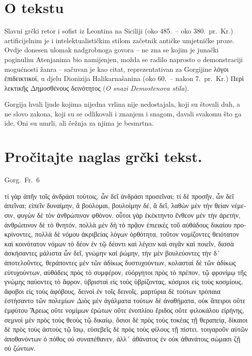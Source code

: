 
\section*{O tekstu}

Slavni grčki retor i sofist iz Leontina na Siciliji (oko 485.\ – oko 380.\ pr.~Kr.) artificijelnim je i intelektualističkim stilom začetnik antičke umjetničke proze. Ovdje donesen ulomak nadgrobnoga govora – ne zna se kojim je junački poginulim Atenjanima bio namijenjen, možda se radilo naprosto o demonstraciji mogućnosti žanra – sačuvan je kao citat, reprezentativan za Gorgijine \textgreek{λόγοι ἐπιδεικτικοί,} u djelu Dionizija Halikarnašanina (oko 60.\ – nakon 7.\ pr.~Kr.) \textgreek{Περὶ λεκτικῆς Δημοσθένους δεινότητος} (\textit{O snazi Demostenova stila}).

Gorgija hvali ljude kojima nijedna vrlina nije nedostajala, koji su štovali duh, a ne slovo zakona, koji su se odlikovali i znanjem i snagom, davali svakomu što ga ide. Oni su umrli, ali čežnja za njima je besmrtna.



\section*{Pročitajte naglas grčki tekst.}

Gorg.\ Fr.\ 6


\medskip


{\large

\begin{greek}

\noindent τί γὰρ ἀπῆν τοῖς ἀνδράσι τούτοις, ὧν δεῖ ἀνδράσι προσεῖναι; τί δὲ προσῆν, ὧν δεῖ ἀπεῖναι; εἰπεῖν δυναίμην, ἃ βούλομαι, βουλοίμην δέ, ἃ δεῖ, λαθὼν μὲν τὴν θείαν νέμεσιν, φυγὼν δὲ τὸν ἀνθρώπινον φθόνον. οὗτοι γὰρ ἐκέκτηντο ἔνθεον μὲν τὴν ἀρετήν, ἀνθρώπινον δὲ τὸ θνητόν, πολλὰ μὲν δὴ τὸ πρᾷον ἐπιεικὲς τοῦ αὐθάδους δικαίου προκρίνοντες, πολλὰ δὲ νόμου ἀκριβείας λόγων ὀρθότητα, τοῦτον νομίζοντες θειότατον καὶ κοινότατον νόμων τὸ δέον ἐν τῷ δέοντι καὶ λέγειν καὶ σιγᾶν καὶ ποιεῖν, δισσὰ ἀσκήσαντες μάλιστα ὧν δεῖ, γνώμην καὶ ῥώμην, τὴν μὲν βουλεύοντες τὴν δ´ ἀποτελοῦντες, θεράποντες μὲν τῶν ἀδίκως δυστυχούντων, κολασταὶ δὲ τῶν ἀδίκως εὐτυχούντων, αὐθάδεις πρὸς τὸ συμφέρον, εὐόργητοι πρὸς τὸ πρέπον, τῷ φρονίμῳ τῆς γνώμης παύοντες τὸ ἄφρον, ὑβρισταὶ εἰς τοὺς ὑβρίζοντας, κόσμιοι εἰς τοὺς κοσμίους, ἄφοβοι εἰς τοὺς ἀφόβους, δεινοὶ ἐν τοῖς δεινοῖς. μαρτύρια δὲ τούτων τρόπαια ἐστήσαντο τῶν πολεμίων Διὸς μὲν ἀγάλματα τούτων δὲ ἀναθήματα, οὐκ ἄπειροι οὔτε ἐμφύτου Ἄρεως οὔτε νομίμων ἐρώτων οὔτε ἐνοπλίου ἔριδος οὔτε φιλοκάλου εἰρήνης, σεμνοὶ μὲν πρὸς τοὺς θεοὺς τῷ δικαίῳ, ὅσιοι δὲ πρὸς τοὺς τοκέας τῇ θεραπείᾳ, δίκαιοι δὲ πρὸς τοὺς ἀστοὺς τῷ ἴσῳ, εὐσεβεῖς δὲ πρὸς τοὺς φίλους τῇ πίστει. τοιγαροῦν αὐτῶν ἀποθανόντων ὁ πόθος οὐ συναπέθανεν, ἀλλ´ ἀθάνατος ἐν οὐκ ἀθανάτοις σώμασι ζῇ οὐ ζώντων.

\end{greek}

}



